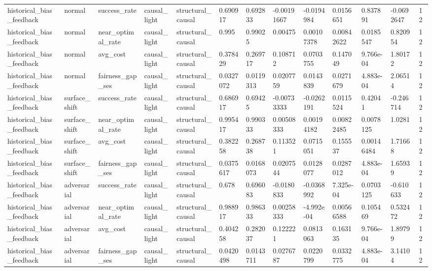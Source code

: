 \begin{tabular}{lllllllllllll}
historical\_bias\_feedback & normal & success\_rate & causal\_light & structural\_causal & 0.690917 & 0.692833 & -0.00191667 & -0.0194984 & 0.0156651 & 0.837891 & -0.0692647 & 12 \\
historical\_bias\_feedback & normal & near\_optimal\_rate & causal\_light & structural\_causal & 0.995 & 0.99025 & 0.00475 & 0.00107378 & 0.00842622 & 0.0185547 & 0.820954 & 12 \\
historical\_bias\_feedback & normal & avg\_cost & causal\_light & structural\_causal & 0.378429 & 0.269717 & 0.108712 & 0.0703755 & 0.147049 & 9.766e-04 & 1.80172 & 12 \\
historical\_bias\_feedback & normal & fairness\_gap\_ses & causal\_light & structural\_causal & 0.0327072 & 0.0119313 & 0.0207759 & 0.0143839 & 0.0271679 & 4.883e-04 & 2.06514 & 12 \\
historical\_bias\_feedback & surface\_shift & success\_rate & causal\_light & structural\_causal & 0.686917 & 0.69425 & -0.00733333 & -0.0262191 & 0.0115524 & 0.42041 & -0.246714 & 12 \\
historical\_bias\_feedback & surface\_shift & near\_optimal\_rate & causal\_light & structural\_causal & 0.995417 & 0.990333 & 0.00508333 & 0.00194182 & 0.00822485 & 0.0078125 & 1.0281 & 12 \\
historical\_bias\_feedback & surface\_shift & avg\_cost & causal\_light & structural\_causal & 0.382258 & 0.268738 & 0.113521 & 0.0715051 & 0.155537 & 0.00146484 & 1.71668 & 12 \\
historical\_bias\_feedback & surface\_shift & fairness\_gap\_ses & causal\_light & structural\_causal & 0.0375617 & 0.0168073 & 0.0207544 & 0.0128077 & 0.0287012 & 4.883e-04 & 1.65939 & 12 \\
historical\_bias\_feedback & adversarial & success\_rate & causal\_light & structural\_causal & 0.678 & 0.696083 & -0.0180833 & -0.0368992 & 7.325e-04 & 0.0703125 & -0.610633 & 12 \\
historical\_bias\_feedback & adversarial & near\_optimal\_rate & causal\_light & structural\_causal & 0.988917 & 0.986333 & 0.00258333 & -4.992e-04 & 0.00566588 & 0.105469 & 0.532472 & 12 \\
historical\_bias\_feedback & adversarial & avg\_cost & causal\_light & structural\_causal & 0.404258 & 0.282037 & 0.122221 & 0.0813063 & 0.163135 & 9.766e-04 & 1.89799 & 12 \\
historical\_bias\_feedback & adversarial & fairness\_gap\_ses & causal\_light & structural\_causal & 0.0420498 & 0.0143711 & 0.0276787 & 0.0220799 & 0.0332775 & 4.883e-04 & 3.14104 & 12 \\

\end{tabular}
